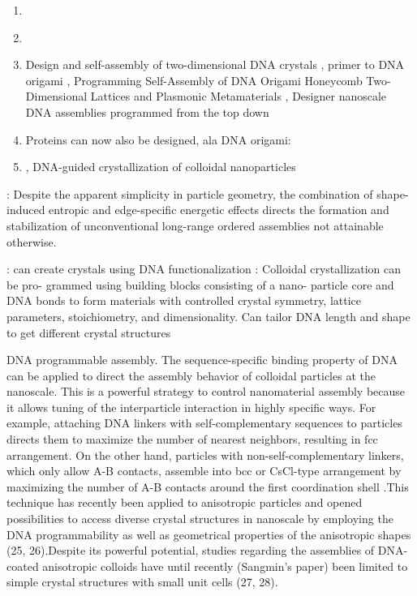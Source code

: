 \begin{enumerate}
\item \cite{Damasceno_2012_Science,Ye_2013_NatChem,Zhang_2004_NanoLetters,GlotzerSolomon_2007_Nature}
\item \cite{Jankowski_2009_JChemPhys,Jankowski_2011_JPhysChemB,Jankowski_2012_SoftMatter}
\item Design and self-assembly of two-dimensional DNA crystals \cite{Winfree_1998_Nature}, primer to DNA origami \cite{Castro_2011_Nature}, Programming Self-Assembly of DNA Origami Honeycomb Two-Dimensional Lattices and Plasmonic Metamaterials \cite{Wang_2016_JACS}, Designer nanoscale DNA assemblies programmed from the top down \cite{Veneziano_2016_Science}
\item Proteins can now also be designed, ala DNA origami: \cite{Huang_2016_Nature}
\item \cite{Mirkin_1996_Nature,Park_2008_Nature,OBrien_2016_JACS,Liu_2016_Nature}, DNA-guided crystallization of colloidal nanoparticles \cite{Nykypanchuk_2008_Nature}
\end{enumerate}

\cite{Ye_2013_NatChem}: Despite the apparent simplicity in particle geometry, the combination of shape-induced entropic and edge-specific energetic effects directs the formation and stabilization of unconventional long-range ordered assemblies not attainable otherwise.

\cite{Park_2008_Nature}: can create crystals using DNA functionalization
\cite{OBrien_2016_JACS}: Colloidal crystallization can be pro- grammed using building blocks consisting of a nano- particle core and DNA bonds to form materials with controlled crystal symmetry, lattice parameters, stoichiometry, and dimensionality. Can tailor DNA length and shape to get different crystal structures

DNA programmable assembly. The sequence-specific binding property of DNA can be applied to direct the assembly behavior of colloidal particles at the nanoscale. This is a powerful strategy to control nanomaterial assembly because it allows tuning of the interparticle interaction in highly specific ways. For example, attaching DNA linkers with self-complementary sequences to particles directs them to maximize the number of nearest neighbors, resulting in fcc arrangement. On the other hand, particles with non-self-complementary linkers, which only allow A-B contacts, assemble into bcc or CsCl-type arrangement by maximizing the number of A-B contacts around the first coordination shell \cite{Park_2008_Nature}.This technique has recently been applied to anisotropic particles and opened possibilities to access diverse crystal structures in nanoscale by employing the DNA programmability as well as geometrical properties of the anisotropic shapes (25, 26).Despite its powerful potential, studies regarding the assemblies of DNA-coated anisotropic colloids have until recently (Sangmin's paper) been limited to simple crystal structures with small unit cells (27, 28). 

